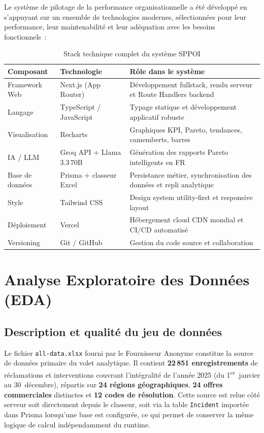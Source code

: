 \documentclass[10pt,a4paper]{report}
\begin{document}
Le système de pilotage de la performance organisationnelle a été développé en s'appuyant sur un ensemble de technologies modernes, sélectionnées pour leur performance, leur maintenabilité et leur adéquation avec les besoins fonctionnels~:

\begin{table}[H]
\centering
\caption{Stack technique complet du système SPPOI}
\begin{tabularx}{\textwidth}{L{3cm} L{4.5cm} X}
\toprule
{}
\textbf{\color{ttblue}Composant} & \textbf{\color{ttblue}Technologie} & \textbf{\color{ttblue}Rôle dans le système} \\
\midrule
Framework Web  & Next.js (App Router)    & Développement fullstack, rendu serveur et Route Handlers backend \\
Langage        & TypeScript / JavaScript & Typage statique et développement applicatif robuste \\
Visualisation  & Recharts                & Graphiques KPI, Pareto, tendances, camemberts, barres \\
IA / LLM       & Groq API + Llama\,3.3\,70B & Génération des rapports Pareto intelligents en FR \\
Base de données & Prisma + classeur Excel & Persistance métier, synchronisation des données et repli analytique \\
Style          & Tailwind CSS            & Design system utility-first et responsive layout \\
Déploiement    & Vercel                  & Hébergement cloud CDN mondial et CI/CD automatisé \\
Versioning     & Git / GitHub            & Gestion du code source et collaboration \\
\bottomrule
\end{tabularx}
\label{tab:stack}
\end{table}

\section{Analyse Exploratoire des Données (EDA)}

\subsection{Description et qualité du jeu de données}

Le fichier \texttt{all-data.xlsx} fourni par le Fournisseur Anonyme constitue la source de données primaire du volet analytique. Il contient \textbf{22\,851 enregistrements} de réclamations et interventions couvrant l'intégralité de l'année 2025 (du 1\textsuperscript{er}~janvier au 30~décembre), répartis sur \textbf{24 régions géographiques}, \textbf{24 offres commerciales} distinctes et \textbf{12 codes de résolution}. Cette source est relue côté serveur soit directement depuis le classeur, soit via la table \texttt{Incident} importée dans Prisma lorsqu'une base est configurée, ce qui permet de conserver la même logique de calcul indépendamment du runtime.
\end{document}
